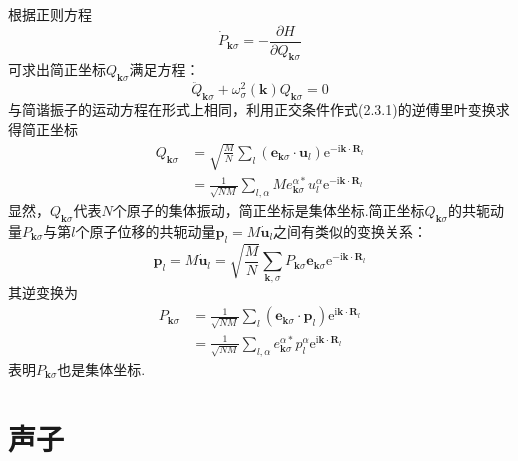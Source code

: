 根据正则方程
\begin{equation*}
  \dot{P}_{\boldsymbol{k}\sigma}=-\frac{\partial H}{\partial Q_{\boldsymbol{k}\sigma}}
\end{equation*}
可求出简正坐标$Q_{\boldsymbol{k}\sigma}$满足方程：
\begin{equation}
  \ddot{Q}_{\boldsymbol{k}\sigma}+\omega_{\sigma}^2(\boldsymbol{k})Q_{\boldsymbol{k}\sigma}=0
\end{equation}
与简谐振子的运动方程在形式上相同，利用正交条件作式(2.3.1)的逆傅里叶变换求得简正坐标
\begin{equation}
\begin{aligned}
  Q_{\boldsymbol{k}\sigma}&=\sqrt{\frac{M}{N}}\sum_l
  (\boldsymbol{e}_{\boldsymbol{k}\sigma}\cdot\boldsymbol{u}_l)
  \mathrm{e}^{-\mathrm{i}\boldsymbol{k}\cdot\boldsymbol{R}_l}\\
  &=\frac{1}{\sqrt{NM}}\sum_{l,\alpha}Me_{\boldsymbol{k}\sigma}^{\alpha *}
  u_l^{\alpha}\mathrm{e}^{-\mathrm{i}\boldsymbol{k}\cdot\boldsymbol{R}_l}
\end{aligned}
\end{equation}
显然，$Q_{\boldsymbol{k}\sigma}$代表$N$个原子的集体振动，简正坐标是集体坐标.简正坐标$Q_{\boldsymbol{k}\sigma}$的共轭动量$P_{\boldsymbol{k}\sigma}$与第$l$个原子位移的共轭动量$\boldsymbol{p}_l=M\dot{\boldsymbol{u}}_l$之间有类似的变换关系：
\begin{equation}
  \boldsymbol{p}_l=M\dot{\boldsymbol{u}}_l=\sqrt{\frac{M}{N}}
  \sum_{\boldsymbol{k},\sigma}P_{\boldsymbol{k}\sigma}\boldsymbol{e}_{\boldsymbol{k}\sigma}
  \mathrm{e}^{-\mathrm{i}\boldsymbol{k}\cdot\boldsymbol{R}_l}
\end{equation}
其逆变换为
\begin{equation}
\begin{aligned}
  P_{\boldsymbol{k}\sigma}&=\frac{1}{\sqrt{NM}}\sum_l
  (\boldsymbol{e}_{\boldsymbol{k}\sigma}\cdot\boldsymbol{p}_l)
  \mathrm{e}^{\mathrm{i}\boldsymbol{k}\cdot\boldsymbol{R}_l}\\
  &=\frac{1}{\sqrt{NM}}\sum_{l,\alpha}e_{\boldsymbol{k}\sigma}^{\alpha *}
  p_l^{\alpha}\mathrm{e}^{\mathrm{i}\boldsymbol{k}\cdot\boldsymbol{R}_l}
\end{aligned}
\end{equation}
表明$P_{\boldsymbol{k}\sigma}$也是集体坐标.

\section{声子}

